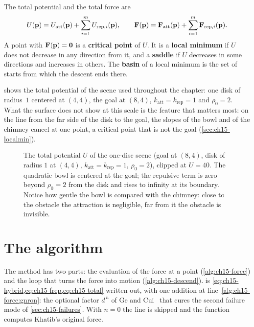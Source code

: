 \begin{definition}
\label{def:ch15-total}
The total potential and the total force are
\begin{equation}
  U(\mathbf{p}) = U_{\mathrm{att}}(\mathbf{p}) + \sum_{i=1}^{m} U_{\mathrm{rep},i}(\mathbf{p}),
  \qquad
  \mathbf{F}(\mathbf{p}) = \mathbf{F}_{\mathrm{att}}(\mathbf{p}) + \sum_{i=1}^{m} \mathbf{F}_{\mathrm{rep},i}(\mathbf{p}).
  \label{eq:ch15-total}
\end{equation}
A point with $\mathbf{F}(\mathbf{p}) = \mathbf{0}$ is a \textbf{critical
point} of $U$. It is a \textbf{local
minimum} if $U$ does not
decrease in any direction from it, and a \textbf{saddle} if $U$ decreases in
some directions and increases in others. The \textbf{basin} of a local minimum is the set of starts from which the descent
ends there.
\end{definition}

 shows the total potential of the scene used
throughout the chapter: one disk of radius~$1$ centered at $(4, 4)$, the goal
at $(8, 4)$, $k_{\mathrm{att}} = k_{\mathrm{rep}} = 1$ and $\rho_0 = 2$. What
the surface does not show at this scale is the feature that matters most: on
the line from the far side of the disk to the goal, the slopes of the bowl
and of the chimney cancel at one point, a critical point that is not the goal
(\cref{sec:ch15-localmin}).

\begin{figure}[tb]
  \centering
  \caption{The total potential $U$ of the one-disc scene (goal at $(8,4)$,
  disk of radius $1$ at $(4,4)$, $k_{\mathrm{att}} = k_{\mathrm{rep}} = 1$,
  $\rho_0 = 2$), clipped at $U = 40$. The quadratic bowl is centered at the
  goal; the repulsive term is zero beyond $\rho_0 = 2$ from the disk and rises
  to infinity at its boundary. Notice how gentle the bowl is compared with the
  chimney: close to the obstacle the attraction is negligible, far from it the
  obstacle is invisible.}
  \label{fig:ch15-surface}
\end{figure}

\section{The algorithm}
\label{sec:ch15-algorithm}

The method has two parts: the evaluation of the force at a point
(\cref{alg:ch15-force}) and the loop that turns the force into motion
(\cref{alg:ch15-descend}).  is
\cref{eq:ch15-hybrid,eq:ch15-frep,eq:ch15-total} written out, with one
addition at line~\ref{alg:ch15-force:gnron}: the optional factor $d^{\,n}$ of
Ge and Cui~\cite{ge2000new} that cures the second failure mode of
\cref{sec:ch15-failures}. With $n = 0$ the line is skipped and the function
computes Khatib's original force.

